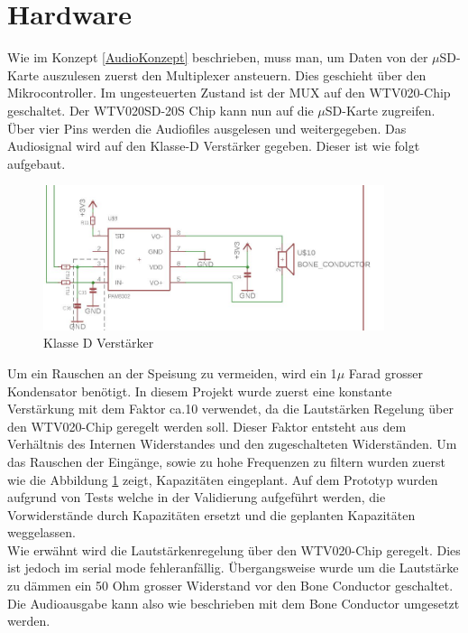\section{Hardware}
Wie im Konzept \ref{AudioKonzept}
 beschrieben, muss man, um Daten von der $\mu$SD-Karte auszulesen zuerst den Multiplexer ansteuern. Dies geschieht über den Mikrocontroller. Im ungesteuerten Zustand ist der MUX auf den WTV020-Chip geschaltet. Der WTV020SD-20S Chip kann nun auf die $\mu$SD-Karte zugreifen. Über vier Pins werden die Audiofiles ausgelesen und weitergegeben. Das Audiosignal wird auf den Klasse-D Verstärker gegeben. Dieser ist wie folgt aufgebaut.
\begin{figure}[h!]
	\centering
	\includegraphics[width=10cm]{Bilder/Klasse-D.jpg}
	\caption{Klasse D Verstärker}
	\label{Klasse-D}
\end{figure}


Um ein Rauschen an der Speisung zu vermeiden, wird ein 1$\mu$ Farad grosser Kondensator benötigt. In diesem Projekt wurde zuerst eine konstante Verstärkung mit dem Faktor ca.10 verwendet, da die Lautstärken Regelung über den WTV020-Chip geregelt werden soll. Dieser Faktor entsteht aus dem Verhältnis des Internen Widerstandes und den zugeschalteten Widerständen. Um das Rauschen der Eingänge, sowie zu hohe Frequenzen zu filtern wurden zuerst wie die Abbildung \ref{Klasse-D} zeigt, Kapazitäten eingeplant. Auf dem Prototyp wurden aufgrund von Tests welche in der Validierung aufgeführt werden, die Vorwiderstände durch Kapazitäten ersetzt und die geplanten Kapazitäten weggelassen.\\ Wie erwähnt wird die Lautstärkenregelung über den WTV020-Chip geregelt. Dies ist jedoch im serial mode fehleranfällig. Übergangsweise wurde um die Lautstärke zu dämmen ein 50 Ohm grosser Widerstand vor den Bone Conductor geschaltet. Die Audioausgabe kann also wie beschrieben mit dem Bone Conductor umgesetzt werden.

